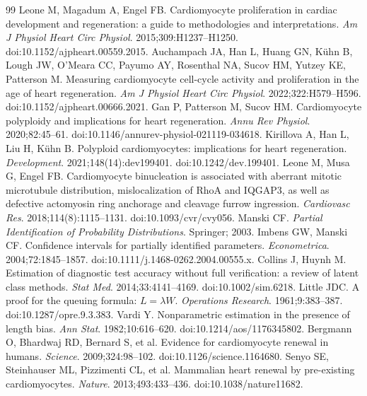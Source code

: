 \documentclass[11pt]{article}
\begin{document}
\begin{thebibliography}{99}
 Leone M, Magadum A, Engel FB. Cardiomyocyte proliferation in cardiac development and regeneration: a guide to methodologies and interpretations. \textit{Am J Physiol Heart Circ Physiol}. 2015;309:H1237--H1250. doi:10.1152/ajpheart.00559.2015.
 Auchampach JA, Han L, Huang GN, K\"uhn B, Lough JW, O'Meara CC, Payumo AY, Rosenthal NA, Sucov HM, Yutzey KE, Patterson M. Measuring cardiomyocyte cell-cycle activity and proliferation in the age of heart regeneration. \textit{Am J Physiol Heart Circ Physiol}. 2022;322:H579--H596. doi:10.1152/ajpheart.00666.2021.
 Gan P, Patterson M, Sucov HM. Cardiomyocyte polyploidy and implications for heart regeneration. \textit{Annu Rev Physiol}. 2020;82:45--61. doi:10.1146/annurev-physiol-021119-034618.
 Kirillova A, Han L, Liu H, K\"uhn B. Polyploid cardiomyocytes: implications for heart regeneration. \textit{Development}. 2021;148(14):dev199401. doi:10.1242/dev.199401.
 Leone M, Musa G, Engel FB. Cardiomyocyte binucleation is associated with aberrant mitotic microtubule distribution, mislocalization of RhoA and IQGAP3, as well as defective actomyosin ring anchorage and cleavage furrow ingression. \textit{Cardiovasc Res}. 2018;114(8):1115--1131. doi:10.1093/cvr/cvy056.
 Manski CF. \textit{Partial Identification of Probability Distributions}. Springer; 2003.
 Imbens GW, Manski CF. Confidence intervals for partially identified parameters. \textit{Econometrica}. 2004;72:1845--1857. doi:10.1111/j.1468-0262.2004.00555.x.
 Collins J, Huynh M. Estimation of diagnostic test accuracy without full verification: a review of latent class methods. \textit{Stat Med}. 2014;33:4141--4169. doi:10.1002/sim.6218.
 Little JDC. A proof for the queuing formula: $L=\lambda W$. \textit{Operations Research}. 1961;9:383--387. doi:10.1287/opre.9.3.383.
 Vardi Y. Nonparametric estimation in the presence of length bias. \textit{Ann Stat}. 1982;10:616--620. doi:10.1214/aos/1176345802.
 Bergmann O, Bhardwaj RD, Bernard S, et al. Evidence for cardiomyocyte renewal in humans. \textit{Science}. 2009;324:98--102. doi:10.1126/science.1164680.
 Senyo SE, Steinhauser ML, Pizzimenti CL, et al. Mammalian heart renewal by pre-existing cardiomyocytes. \textit{Nature}. 2013;493:433--436. doi:10.1038/nature11682.
\end{thebibliography}
\end{document}
